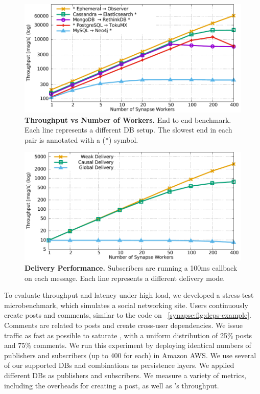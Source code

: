 \begin{figure}[]
  \centering
  \includegraphics[width=\linewidth]{figures/synapse/db-throughput-vs-workers.pdf}
  \caption{{\bf Throughput vs Number of Workers.} End to end benchmark.
      Each line represents a different DB setup.
    The slowest end in each pair is annotated with a (*) symbol.}
    \label{synapse:fig:dbs-throughput}
\end{figure}


\begin{figure}[]
  \centering
  \includegraphics[width=\linewidth]{figures/synapse/throughputvsworkerssaturate.pdf}
  \caption{{\bf Delivery Performance.} Subscribers are running a 100ms callback on each message.
  Each line represents a different delivery mode.}
  \label{synapse:fig:parallel-throughput}
\end{figure}

To evaluate \synapse throughput and latency under high load, we developed a
stress-test microbenchmark, which simulates a social networking site. Users
continuously create posts and comments, similar to the code on \F~\ref{synapse:fig:deps-example}.
Comments are related to posts and create
cross-user dependencies. We issue traffic as fast as possible to saturate \synapse, with a
uniform distribution of 25\% posts and 75\% comments. We run this experiment
by deploying identical numbers of publishers and subscribers (up to 400 for
each) in Amazon AWS. We use several of our supported
DBs and combinations as persistence layers. We applied different DBs as publishers and
subscribers. We measure a variety of metrics, including the overheads for
creating a post, as well as \synapse's throughput.

